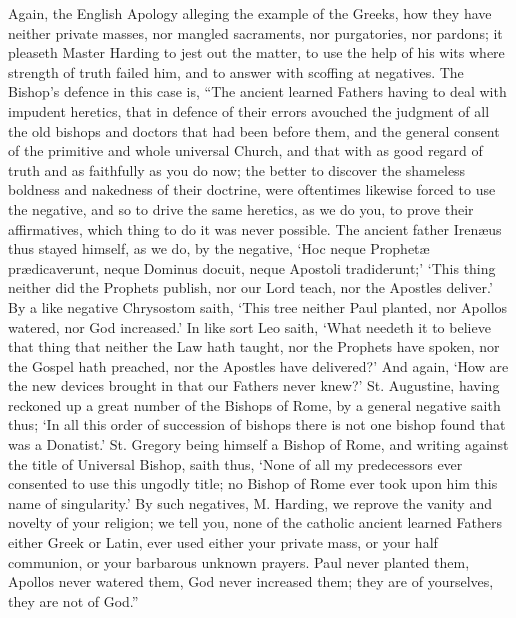 Again, the English Apology alleging the example of the Greeks, how they have neither private masses, nor mangled sacraments, nor purgatories, nor pardons; it pleaseth Master Harding to jest out the matter, to use the help of his wits where strength of truth failed him, and to answer with scoffing at negatives. The Bishop’s defence in this case is, “The ancient learned Fathers having to deal with impudent heretics, that in defence of their errors avouched the judgment of all the old bishops and doctors that had been before them, and the general consent of the primitive and whole universal Church, and that with as good regard of truth and as faithfully as you do now; the better to discover the shameless boldness and nakedness of their doctrine, were oftentimes likewise forced to use the negative, and so to drive the same heretics, as we do you, to prove their affirmatives, which thing to do it was never possible. The ancient father Irenæus thus stayed himself, as we do, by the negative, ‘Hoc neque Prophetæ prædicaverunt, neque Dominus docuit, neque Apostoli tradiderunt;’ ‘This thing neither did the Prophets publish, nor our Lord teach, nor the Apostles deliver.’ By a like negative Chrysostom saith,  ‘This tree neither Paul planted, nor Apollos watered, nor God increased.’ In like sort Leo saith, ‘What needeth it to believe that thing that neither the Law hath taught, nor the Prophets have spoken, nor the Gospel hath preached, nor the Apostles have delivered?’ And again, ‘How are the new devices brought in that our Fathers never knew?’ St. Augustine, having reckoned up a great number of the Bishops of Rome, by a general negative saith thus; ‘In all this order of succession of bishops there is not one bishop found that was a Donatist.’ St. Gregory being himself a Bishop of Rome, and writing against the title of Universal Bishop, saith thus, ‘None of all my predecessors ever consented to use this ungodly title; no Bishop of Rome ever took upon him this name of singularity.’ By such negatives, M. Harding, we reprove the vanity and novelty of your religion; we tell you, none of the catholic ancient learned Fathers either Greek or Latin, ever used either your private mass, or your half communion, or your barbarous unknown prayers. Paul never planted them, Apollos never watered them, God never increased them; they are of yourselves, they are not of God.”

